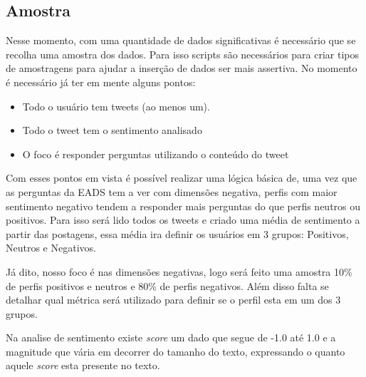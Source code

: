 \subsection{Amostra}
Nesse momento, com uma quantidade de dados significativas é necessário que se recolha uma amostra dos dados. Para isso scripts são necessários para criar tipos de amostragens para ajudar a inserção de dados ser mais assertiva. No momento é necessário já ter em mente alguns pontos:

\begin{itemize}
    \item Todo o usuário tem tweets (ao menos um).
    \item Todo o tweet tem o sentimento analisado
    \item O foco é responder perguntas utilizando o conteúdo do tweet
\end{itemize}

Com esses pontos em vista é possível realizar uma lógica básica de, uma vez que as perguntas da EADS tem a ver com dimensões negativa, perfis com maior sentimento negativo tendem a responder mais perguntas do que perfis neutros ou positivos. Para isso será lido todos os tweets e criado uma média de sentimento a partir das postagens, essa média ira definir os usuários em 3 grupos: Positivos, Neutros e Negativos.

Já dito, nosso foco é nas dimensões negativas, logo será feito uma amostra 10\% de perfis positivos e neutros e 80\% de perfis negativos. Além disso falta se detalhar qual métrica será utilizado para definir se o perfil esta em um dos 3 grupos.

Na analise de sentimento existe \textit{score} um dado que segue de -1.0 até 1.0 e a magnitude que vária em decorrer do tamanho do texto, expressando o quanto aquele \textit{score} esta presente no texto.
